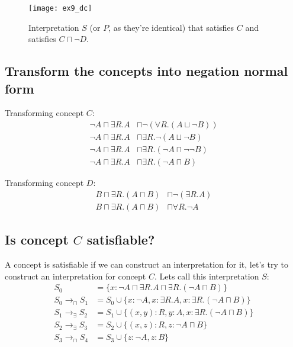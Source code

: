 \documentclass[a4paper,12pt]{article}
\begin{document}
\begin{figure}[tb]
\centering
\texttt{[image: ex9\_dc]}
\caption{Interpretation $S$ (or $P$, as they're identical) that satisfies $C$
and satisfies $ C \sqcap \neg D $.}
\label{cdconpets}
\end{figure}

\subsection[NNF]{Transform the concepts into negation normal form}
Transforming concept $C$:
\begin{align*}
\neg A \sqcap \exists R.A &\sqcap \neg(\forall R.(A \sqcup \neg B))\\
\neg A \sqcap \exists R.A &\sqcap \exists R.\neg(A \sqcup \neg B)\\
\neg A \sqcap \exists R.A &\sqcap \exists R.(\neg A \sqcap \neg \neg B)\\
\neg A \sqcap \exists R.A &\sqcap \exists R.(\neg A \sqcap B)
\end{align*}

Transforming concept $D$:
\begin{align*}
B \sqcap \exists R.(A \sqcap B) &\sqcap \neg(\exists R.A)\\
B \sqcap \exists R.(A \sqcap B) &\sqcap \forall R.\neg A
\end{align*}

\subsection[Concept C]{Is concept $C$ satisfiable?}
\label{interpretationforc}
A concept is satisfiable if we can construct an interpretation for it, let's
try to construct an interpretation for concept $C$.  Lets call this
interpretation $S$:
\begin{align*}
S_0 &= \{x : \neg A \sqcap \exists R.A \sqcap \exists  R.(\neg A \sqcap B)\}\\
S_0 \to_\sqcap S_1 &= S_0 \cup \{ x : \neg A, x : \exists R.A
                                , x : \exists R.(\neg A \sqcap B) \}\\
S_1 \to_\exists S_2 &= S_1 \cup \{ (x,y) : R, y : A
                                 , x : \exists R.(\neg A \sqcap B) \}\\
S_2 \to_\exists S_3 &= S_2 \cup \{ (x,z) : R, z : \neg A \sqcap B \}\\
S_3 \to_\sqcap S_4 &= S_3 \cup \{ z : \neg A, z : B \}
\end{align*}
\end{document}
